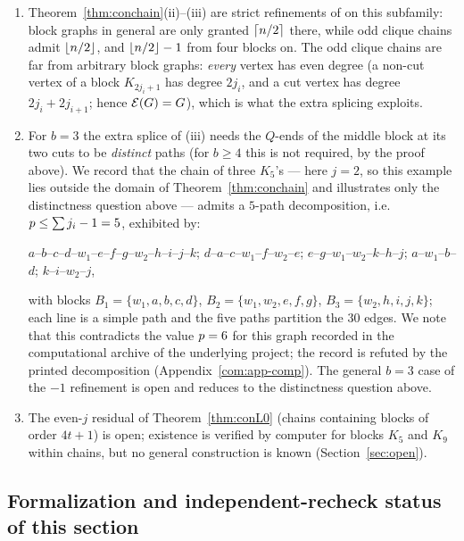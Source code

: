 \begin{remark}
\label{rem:conchaincomp}
\begin{enumerate}[label={\rm(\arabic*)},leftmargin=2em]
\item Theorem~\ref{thm:conchain}(ii)--(iii) are strict refinements of
\cite{CW25} on this subfamily: block graphs in general are only granted
$\left\lceil n/2 \right\rceil$ there, while odd clique chains admit $\left\lfloor n/2 \right\rfloor$, and
$\left\lfloor n/2 \right\rfloor-1$ from four blocks on. The odd clique chains are far from
arbitrary block graphs: \emph{every} vertex has even degree (a non-cut
vertex of a block $K_{2j_i+1}$ has degree $2j_i$, and a cut vertex has
degree $2j_i+2j_{i+1}$; hence $\mathcal{E}(G)=G$), which is what the extra
splicing exploits.
\item For $b=3$ the extra splice of (iii) needs the $Q$-ends of the middle
block at its two cuts to be \emph{distinct} paths (for $b\ge4$ this is not
required, by the proof above). We record that the chain of three $K_5$'s
--- here $j=2$, so this example lies outside the domain of
Theorem~\ref{thm:conchain} and illustrates only the distinctness question
above --- admits a $5$-path decomposition, i.e.\
$p\le\sum j_i-1=5$, exhibited by:
\begin{center}\small
$a$--$b$--$c$--$d$--$w_1$--$e$--$f$--$g$--$w_2$--$h$--$i$--$j$--$k$;\quad
$d$--$a$--$c$--$w_1$--$f$--$w_2$--$e$;\quad
$e$--$g$--$w_1$--$w_2$--$k$--$h$--$j$;\quad
$a$--$w_1$--$b$--$d$;\quad
$k$--$i$--$w_2$--$j$,
\end{center}
with blocks $B_1=\{w_1,a,b,c,d\}$, $B_2=\{w_1,w_2,e,f,g\}$,
$B_3=\{w_2,h,i,j,k\}$; each line is a simple path and the five paths
partition the $30$ edges. We note that this contradicts the value
$p=6$ for this graph recorded in the computational archive of the
underlying project; the record is refuted by the printed decomposition
(Appendix~\ref{com:app-comp}). The general $b=3$ case of the $-1$ refinement
is open and reduces to the distinctness question above.
\item The even-$j$ residual of Theorem~\ref{thm:conL0} (chains containing
blocks of order $4t+1$) is open; existence is verified by computer for
blocks $K_5$ and $K_9$ within chains, but no general construction is known
(Section~\ref{sec:open}).
\end{enumerate}
\end{remark}

\subsection{Formalization and independent-recheck status of this section}
\label{subsec:conformal}

